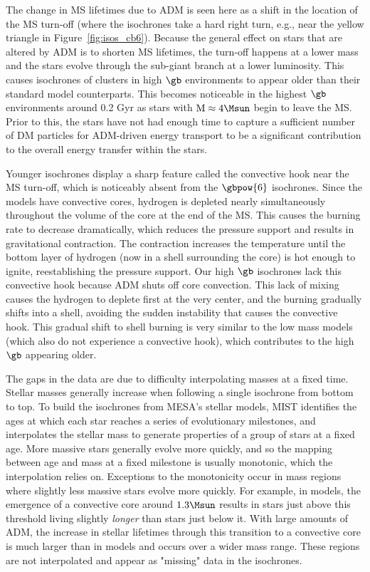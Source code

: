The change in MS lifetimes due to ADM is seen here as a shift in the location of the MS turn-off (where the isochrones take a hard right turn, e.g., near the yellow triangle in Figure~\ref{fig:isos_cb6}). Because the general effect on stars that are altered by ADM is to shorten MS lifetimes, the turn-off happens at a lower mass and the stars evolve through the sub-giant branch at a lower luminosity. This causes isochrones of clusters in high $\gb$ environments to appear older than their standard model counterparts. This becomes noticeable in the highest $\gb$ environments around 0.2 Gyr as stars with $\rm{M} \approx 4 \Msun$ begin to leave the MS. Prior to this, the stars have not had enough time to capture a sufficient number of DM particles for ADM-driven energy transport to be a significant contribution to the overall energy transfer within the stars.

Younger \nodm isochrones display a sharp feature called the convective hook near the MS turn-off, which is noticeably absent from the $\gbpow{6}$ isochrones. Since the \nodm models have convective cores, hydrogen is depleted nearly simultaneously throughout the volume of the core at the end of the MS. This causes the burning rate to decrease dramatically, which reduces the pressure support and results in gravitational contraction. The contraction increases the temperature until the bottom layer of hydrogen (now in a shell surrounding the core) is hot enough to ignite, reestablishing the pressure support. Our high $\gb$ isochrones lack this convective hook because ADM shuts off core convection. This lack of mixing causes the hydrogen to deplete first at the very center, and the burning gradually shifts into a shell, avoiding the sudden instability that causes the convective hook. This gradual shift to shell burning is very similar to the low mass \nodm models (which also do not experience a convective hook), which contributes to the high $\gb$ appearing older.

The gaps in the data are due to difficulty interpolating masses at a fixed time. Stellar masses generally increase when following a single isochrone from bottom to top. To build the isochrones from MESA's stellar models, MIST identifies the ages at which each star reaches a series of evolutionary milestones, and interpolates the stellar mass to generate properties of a group of stars at a fixed age. More massive stars generally evolve more quickly, and so the mapping between age and mass at a fixed milestone is usually monotonic, which the interpolation relies on. Exceptions to the monotonicity occur in mass regions where slightly less massive stars evolve more quickly. For example, in \nodm models, the emergence of a convective core around $1.3 \Msun$ results in stars just above this threshold living slightly \textit{longer} than stars just below it. With large amounts of ADM, the increase in stellar lifetimes through this transition to a convective core is much larger than in \nodm models and occurs over a wider mass range. These regions are not interpolated and appear as "missing" data in the isochrones.


